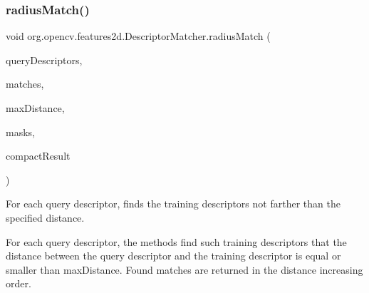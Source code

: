 \subsubsection{\texorpdfstring{radius\+Match()}{radiusMatch()}\hspace{0.1cm}{\footnotesize\ttfamily [3/4]}}
{\footnotesize\ttfamily void org.\+opencv.\+features2d.\+Descriptor\+Matcher.\+radius\+Match (\begin{DoxyParamCaption}\item[{\mbox{\hyperlink{classorg_1_1opencv_1_1core_1_1_mat}{Mat}}}]{query\+Descriptors,  }\item[{List$<$ \mbox{\hyperlink{classorg_1_1opencv_1_1core_1_1_mat_of_d_match}{Mat\+Of\+D\+Match}} $>$}]{matches,  }\item[{float}]{max\+Distance,  }\item[{List$<$ \mbox{\hyperlink{classorg_1_1opencv_1_1core_1_1_mat}{Mat}} $>$}]{masks,  }\item[{boolean}]{compact\+Result }\end{DoxyParamCaption})}

For each query descriptor, finds the training descriptors not farther than the specified distance.

For each query descriptor, the methods find such training descriptors that the distance between the query descriptor and the training descriptor is equal or smaller than {\ttfamily max\+Distance}. Found matches are returned in the distance increasing order.


